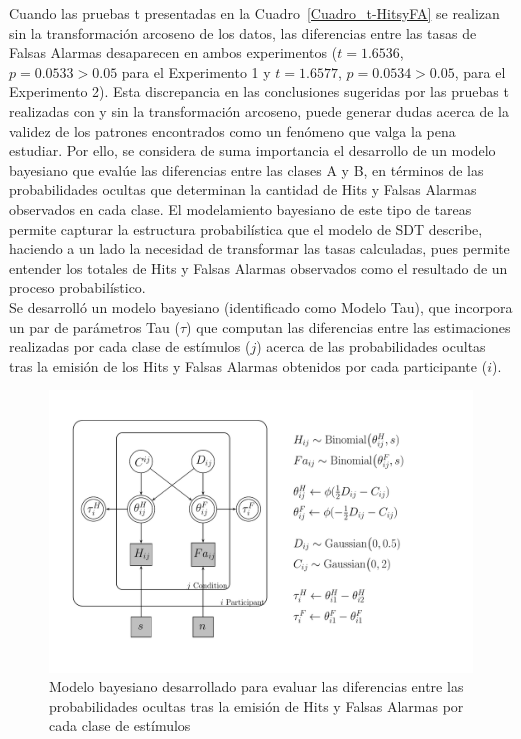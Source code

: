 Cuando las pruebas t presentadas en la Cuadro~\ref{Cuadro_t-HitsyFA} se realizan sin la transformación arcoseno de los datos, las diferencias entre las tasas de Falsas Alarmas desaparecen en ambos experimentos ($t=1.6536$, $p=0.0533>0.05$ para el Experimento 1 y $t=1.6577$, $p=0.0534>0.05$, para el Experimento 2). Esta discrepancia en las conclusiones sugeridas por las pruebas t realizadas con y sin la transformación arcoseno, puede generar dudas acerca de la validez de los patrones encontrados como un fenómeno que valga la pena estudiar. Por ello, se considera de suma importancia el desarrollo de un modelo bayesiano que evalúe las diferencias entre las clases A y B, en términos de las probabilidades ocultas que determinan la cantidad de Hits y Falsas Alarmas observados en cada clase. El modelamiento bayesiano de este tipo de tareas permite capturar la estructura probabilística que el modelo de SDT describe, haciendo a un lado la necesidad de transformar las tasas calculadas, pues permite entender los totales de Hits y Falsas Alarmas observados como el resultado de un proceso probabilístico.\\

Se desarrolló un modelo bayesiano (identificado como Modelo Tau), que incorpora un par de parámetros Tau ($\tau$) que computan las diferencias entre las estimaciones realizadas por cada clase de estímulos ($j$) acerca de las probabilidades ocultas tras la emisión de los Hits y Falsas Alarmas obtenidos por cada participante ($i$).\\ 

\begin{figure}[h]
\centering
\includegraphics[width=1.1\textwidth]{Figures/Model_Tau_Diff_Tetas}
\decoRule
\caption[Modelo Tau: Modelo Bayesiano para evaluar las diferencias entre las $\theta$ de Hits y Falsas Alarmas de cada clase de estímulos]{Modelo bayesiano desarrollado para evaluar las diferencias entre las probabilidades ocultas tras la emisión de Hits y Falsas Alarmas por cada clase de estímulos}
\label{fig:Mod_Tau}
\end{figure}

